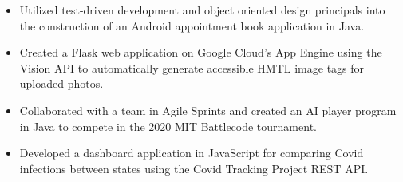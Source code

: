 \documentclass[11pt]{article}
\begin{document}
\begin{itemize}[leftmargin=*, itemsep=0pt, topsep=5pt]
	\item Utilized test-driven development and object oriented design principals into the construction of an Android appointment book application in Java.
	\item Created a Flask web application on Google Cloud’s App Engine using the Vision API to automatically generate accessible HMTL image tags for uploaded photos.
	\item Collaborated with a team in Agile Sprints and created an AI player program in Java to compete in the 2020 MIT Battlecode tournament.
	\item Developed a dashboard application in JavaScript for comparing Covid infections between states using the Covid Tracking Project REST API.
\end{itemize} 
\smallskip
\end{document}
